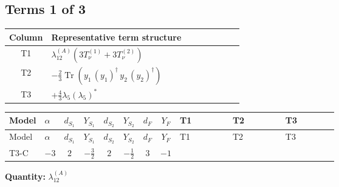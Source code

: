 \documentclass[8pt]{article}
\begin{document}
\begin{landscape}
\subsection*{Terms 1 of 3}
\begin{center}
\begin{tabular}{@{}c >{\raggedright\arraybackslash}p{0.82\linewidth}@{}}
\toprule
Column & Representative term structure \\
\midrule
T1 & \(\displaystyle {\lambda_{12}^{(A)}} (3 T_{\nu}^{(1)}+3 T_{\nu}^{(2)})\) \\
\midrule
T2 & \(\displaystyle -\frac{2}{3} \operatorname{Tr}\!\left({y_1}\,\left({y_1}\right)^{\dagger}\,{y_2}\,\left({y_2}\right)^{\dagger}\right)\) \\
\midrule
T3 & \(\displaystyle +\frac{4}{3} {\lambda_5} \left({\lambda_5}\right)^{*}\) \\
\midrule
\bottomrule
\end{tabular}
\end{center}
\smallskip
\tiny
\begin{longtable}{@{}llcccccc >{\raggedright\arraybackslash}p{0.21\linewidth} >{\raggedright\arraybackslash}p{0.21\linewidth} >{\raggedright\arraybackslash}p{0.21\linewidth}@{}}
\toprule
Model & $\alpha$ & $d_{S_1}$ & $Y_{S_1}$ & $d_{S_2}$ & $Y_{S_2}$ & $d_F$ & $Y_F$ & T1 & T2 & T3 \\
\midrule
\endfirsthead
\toprule
Model & $\alpha$ & $d_{S_1}$ & $Y_{S_1}$ & $d_{S_2}$ & $Y_{S_2}$ & $d_F$ & $Y_F$ & T1 & T2 & T3 \\
\midrule
\endhead
T3-C & $-3$ & $2$ & $-\frac{3}{2}$ & $2$ & $-\frac{1}{2}$ & $3$ & $-1$ & \scriptsize\adjustbox{max width=\linewidth}{$\begin{gathered} {\lambda_{12}^{(A)}} (3 T_{\nu}^{(1)}+3 T_{\nu}^{(2)})\end{gathered}$} & \scriptsize\adjustbox{max width=\linewidth}{$\begin{gathered} -\frac{2}{3} \operatorname{Tr}\!\left({y_1}\,\left({y_1}\right)^{\dagger}\,{y_2}\,\left({y_2}\right)^{\dagger}\right)\end{gathered}$} & \scriptsize\adjustbox{max width=\linewidth}{$\begin{gathered} +\frac{4}{3} {\lambda_5} \left({\lambda_5}\right)^{*}\end{gathered}$} \\
\midrule
\bottomrule
\end{longtable}
\clearpage
\noindent\textbf{Quantity: }$\lambda_{12}^{(A)}$\par\smallskip

\end{landscape}
\end{document}
